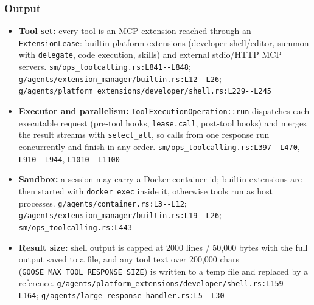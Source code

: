 \subsubsection*{Output}
\begin{itemize}
\item \textbf{Tool set:} every tool is an MCP extension reached through an \texttt{ExtensionLease}: builtin platform extensions (developer shell/editor, summon with \texttt{delegate}, code execution, skills) and external stdio/HTTP MCP servers. \texttt{sm/\allowbreak{}ops\_\allowbreak{}toolcalling.\allowbreak{}rs:\allowbreak{}L841-\allowbreak{}-\allowbreak{}L848}; \texttt{g/\allowbreak{}agents/\allowbreak{}extension\_\allowbreak{}manager/\allowbreak{}builtin.\allowbreak{}rs:\allowbreak{}L12-\allowbreak{}-\allowbreak{}L26}; \texttt{g/\allowbreak{}agents/\allowbreak{}platform\_\allowbreak{}extensions/\allowbreak{}developer/\allowbreak{}shell.\allowbreak{}rs:\allowbreak{}L229-\allowbreak{}-\allowbreak{}L245}
\item \textbf{Executor and parallelism:} \texttt{ToolExecutionOperation:\allowbreak{}:\allowbreak{}run} dispatches each executable request (pre-tool hooks, \texttt{lease.\allowbreak{}call}, post-tool hooks) and merges the result streams with \texttt{select\_\allowbreak{}all}, so calls from one response run concurrently and finish in any order. \texttt{sm/\allowbreak{}ops\_\allowbreak{}toolcalling.\allowbreak{}rs:\allowbreak{}L397-\allowbreak{}-\allowbreak{}L470}, \texttt{L910-\allowbreak{}-\allowbreak{}L944}, \texttt{L1010-\allowbreak{}-\allowbreak{}L1100}
\item \textbf{Sandbox:} a session may carry a Docker container id; builtin extensions are then started with \texttt{docker exec} inside it, otherwise tools run as host processes. \texttt{g/\allowbreak{}agents/\allowbreak{}container.\allowbreak{}rs:\allowbreak{}L3-\allowbreak{}-\allowbreak{}L12}; \texttt{g/\allowbreak{}agents/\allowbreak{}extension\_\allowbreak{}manager/\allowbreak{}builtin.\allowbreak{}rs:\allowbreak{}L19-\allowbreak{}-\allowbreak{}L26}; \texttt{sm/\allowbreak{}ops\_\allowbreak{}toolcalling.\allowbreak{}rs:\allowbreak{}L443}
\item \textbf{Result size:} shell output is capped at 2000 lines / 50,000 bytes with the full output saved to a file, and any tool text over 200,000 chars (\texttt{GOOSE\_\allowbreak{}MAX\_\allowbreak{}TOOL\_\allowbreak{}RESPONSE\_\allowbreak{}SIZE}) is written to a temp file and replaced by a reference. \texttt{g/\allowbreak{}agents/\allowbreak{}platform\_\allowbreak{}extensions/\allowbreak{}developer/\allowbreak{}shell.\allowbreak{}rs:\allowbreak{}L159-\allowbreak{}-\allowbreak{}L164}; \texttt{g/\allowbreak{}agents/\allowbreak{}large\_\allowbreak{}response\_\allowbreak{}handler.\allowbreak{}rs:\allowbreak{}L5-\allowbreak{}-\allowbreak{}L30}

\end{itemize}
